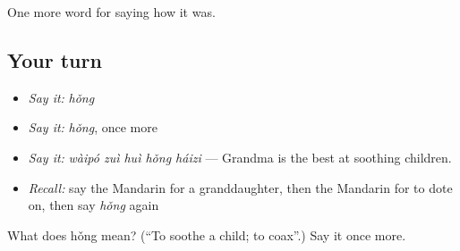 \begin{grammarlens}[title={What you've built}]
One more word for saying how it was.
\end{grammarlens}

\subsection*{Your turn}
\begin{itemize}
\raggedright
  \item \emph{Say it:} \emph{hǒng}
  \item \emph{Say it:} \emph{hǒng}, once more
  \item \emph{Say it:} \emph{wàipó zuì huì hǒng háizi} — Grandma is the best at soothing children.
  \item \emph{Recall:} say the Mandarin for a granddaughter, then the Mandarin for to dote on, then say \emph{hǒng} again
\end{itemize}

\begin{tcolorbox}[breakable,colback=teal!4,colframe=teal!35!black,title={Before you move on}]
What does hǒng mean? (\textquotedblleft{}To soothe a child; to coax\textquotedblright{}.) Say it once more.
\end{tcolorbox}
